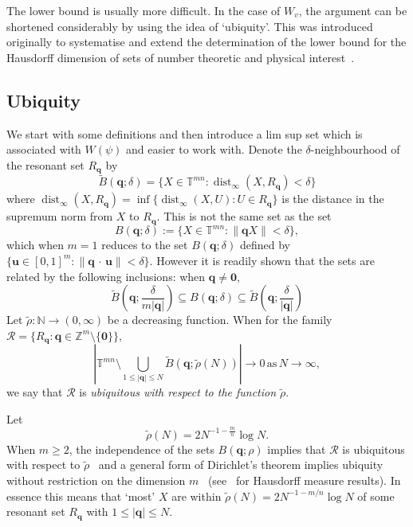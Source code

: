 \documentclass[reqno]{amsart}
\renewcommand{\ge}{\geqslant}
\renewcommand{\le}{\leqslant}
\newcommand{\N}{{\mathbb{N}}}
\newcommand{\T}{{\mathbb{T}}}
\newcommand{\Z}{{\mathbb{Z}}}
\newcommand{\0}{{\mathbf{0}}}
\newcommand{\q}{{\mathbf{q}}}
\newcommand{\col}{\colon}
\newcommand{\dist}{\operatorname{dist}}
\newcommand{\ub}{\mathbf{u}}
\newcommand{\ip}{\,{\cdot}\,}
\newcommand{\cR}{\mathcal{R}}
\def\Bqbd{B(\q;\delta)}
\def\Rq{R_{\q}}
\def\tr{\tilde{\rho}}
\begin{document}
  The lower bound is usually more difficult.  In the case of $W_v$,
  the argument can be shortened considerably by using the idea of
  `ubiquity'.  This was introduced originally to systematise and
  extend the determination of the lower bound for the Hausdorff
  dimension of sets of number theoretic and physical
  interest~\cite{DRV90a}.

\subsection{Ubiquity}
We start with some definitions and then introduce a lim sup set which
is associated with $W(\psi)$ and easier to work with.  Denote the
$\delta$-neighbourhood of the resonant set $\Rq$ by
$$
\widetilde{B}(\q;\delta) = \{X\in \T^{mn} \col \dist_\infty(X,\Rq)<\delta \}
$$
where $\dist_\infty(X,\Rq)= \inf\{\dist_\infty(X,U)\col U\in \Rq\}$ is
the distance in the supremum norm from $X$ to $\Rq$. This is not the
same set as the set 
\begin{equation*}
  B(\q;\delta):=\{X\in \T^{mn}\colon  \|\q X\|<\delta\},
\end{equation*}
which when $m=1$ reduces to the set $B(\q;\delta)$ defined by 
$\{\ub\in [0,1]^m\colon \|\q\ip \ub\| < \delta\}$. 
However it is readily shown that the sets are related by the following
inclusions: when $\q \ne {\mathbf0}$,
\begin{equation}
  \label{eq:inclusions}
  \widetilde{B}(\q;\frac{\delta}{m|\q|}) \subseteq \Bqbd 
  \subseteq \widetilde{B}(\q;\frac{\delta}{|\q|})   
\end{equation}
Let
$\tilde{\rho}\col\N \to (0,\infty)$ be a decreasing function.  When for the
family $\cR = \{R_{\q}:\q \in \Z^m \setminus \{{\mathbf0}\}\}$,
\begin{equation*}
|\T^{mn} \setminus \bigcup_{1\le|\q|\le N} 
\widetilde{B}(\q;\tilde\rho (N))| \to 0 \, {\text {as}}\, N \to \infty,
\end{equation*}
we say that $\cR$ is {\it{ubiquitous with respect to the function
    $\tr$}}.  

Let 
$$
\tr(N) = 2N^{-1-\frac{m}{n}} \log N. 
$$
When $m\ge 2$, the independence of the sets $B(\q;\rho)$ implies that
$\cR$ is ubiquitous with respect to $\tr$~\cite{GPIUsp} and a general
form of Dirichlet's theorem implies ubiquity without restriction on
the dimension $m$~\cite{mmd92,DRV90a} (see~\cite{HDSV97} for Hausdorff
measure results).  In essence this means that `most' $X$ are within
$\tr(N) = 2 N^{-1-m/n} \log N$ of some resonant set $R_{\q}$ with
$1\le|\q| \le N$.
\end{document}
